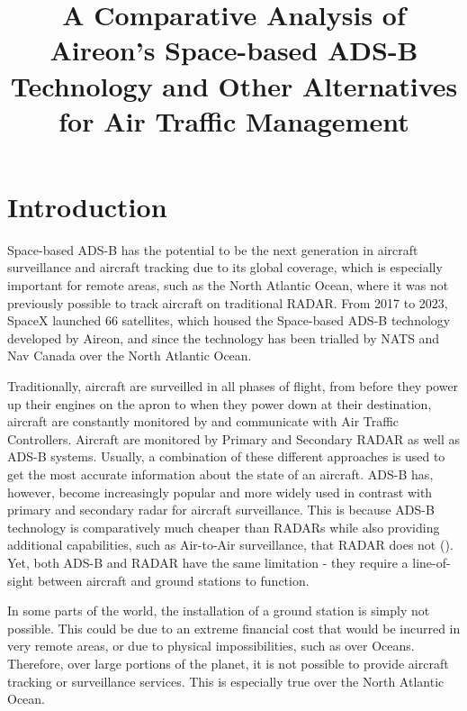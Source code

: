 \documentclass[stu, a4paper, 12pt, floatsintext]{apa7}
\title{A Comparative Analysis of Aireon’s Space-based ADS-B Technology and Other Alternatives for Air Traffic Management}
\numberwithin{figure}{section}
\numberwithin{table}{section}
\numberwithin{equation}{section}
\begin{document}
\maketitle{} %

\tableofcontents
\newpage

\listoffigures
{}
\listoftables
{}
\listofmyequations

\newpage
\section{Introduction}
Space-based ADS-B has the potential to be the next generation in aircraft surveillance and aircraft tracking due to its global coverage, which is especially important for remote areas, such as the North Atlantic Ocean, where it was not previously possible to track aircraft on traditional RADAR. From 2017 to 2023, SpaceX launched 66 satellites, which housed the Space-based ADS-B technology developed by Aireon, and since the technology has been trialled by NATS and Nav Canada over the North Atlantic Ocean. 

Traditionally, aircraft are surveilled in all phases of flight, from before they power up their engines on the apron to when they power down at their destination, aircraft are constantly monitored by and communicate with Air Traffic Controllers. Aircraft are monitored by Primary and Secondary RADAR as well as ADS-B systems. Usually, a combination of these different approaches is used to get the most accurate information about the state of an aircraft. ADS-B has, however, become increasingly popular and more widely used in contrast with primary and secondary radar for aircraft surveillance. This is because ADS-B technology is comparatively much cheaper than RADARs while also providing additional capabilities, such as Air-to-Air surveillance, that RADAR does not (\cite{AvionixTech}). Yet, both ADS-B and RADAR have the same limitation - they require a line-of-sight between aircraft and ground stations to function.

In some parts of the world, the installation of a ground station is simply not possible. This could be due to an extreme financial cost that would be incurred in very remote areas, or due to physical impossibilities, such as over Oceans. Therefore, over large portions of the planet, it is not possible to provide aircraft tracking or surveillance services. This is especially true over the North Atlantic Ocean.  
\end{document}
